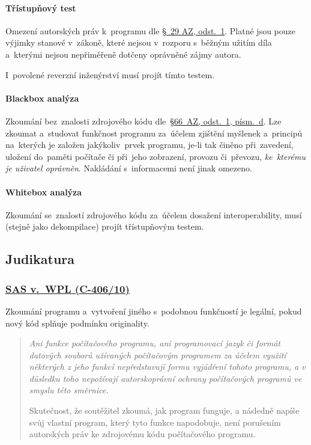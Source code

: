 \paragraph{Třístupňový test} Omezení autorských práv k~programu dle \href{https://www.zakonyprolidi.cz/cs/2000-121#p66-6}{§~29 AZ, odst.~1}. Platné jsou pouze výjimky stanové v~zákoně, které nejsou v~rozporu s~běžným užitím díla a~kterými nejsou nepřiměřeně dotčeny oprávněné zájmy autora.

I~povolené reverzní inženýrství musí projít tímto testem.

\paragraph{Blackbox analýza} Zkoumání bez~znalosti zdrojového kódu dle~{\href{https://www.zakonyprolidi.cz/cs/2000-121#p66-1-d}{§66~AZ, odst.~1, písm.~d}}. Lze zkoumat a~studovat funkčnost programu za~účelem zjištění myšlenek a~principů na~kterých je založen jakýkoliv~prvek programu, je-li tak činěno při~zavedení, uložení do~paměti počítače či při~jeho zobrazení, provozu či~převozu, \emph{ke~kterému je uživatel oprávněn}. Nakládání s~informacemi není jinak omezeno.

\paragraph{Whitebox analýza} Zkoumání se~znalostí zdrojového kódu za~účelem dosažení interoperability, musí (stejně jako dekompilace) projít třístupňovým testem.

\subsection{Judikatura}

\subsubsection{\href{https://curia.europa.eu/juris/liste.jsf?num=C-406\%2F10}{SAS v.~WPL (C-406/10)}}

Zkoumání programu a~vytvoření jiného s~podobnou funkčností je legální, pokud nový kód splňuje podmínku originality.

\blockquote{
	\itshape
	Ani funkce počítačového programu, ani programovací jazyk či formát datových souborů užívaných počítačovým programem za účelem využití některých z jeho funkcí nepředstavují formu vyjádření tohoto programu, a v důsledku toho nepožívají autorskoprávní ochrany počítačových programů ve smyslu této směrnice.

	Skutečnost, že soutěžitel zkoumá, jak program funguje, a následně napíše svůj vlastní program, který tyto funkce napodobuje, není porušením autorských práv ke zdrojovému kódu počítačového programu.}

